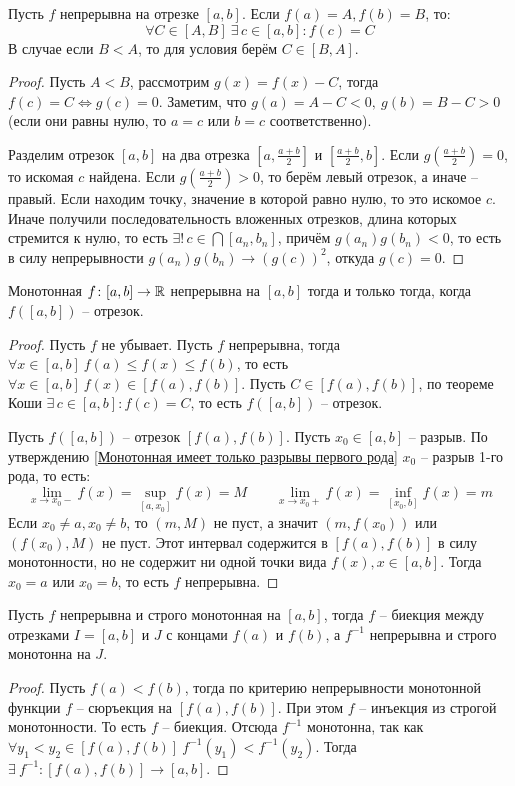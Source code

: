 \documentclass[12pt]{article}
\begin{document}
\begin{theorem}[Коши]
	Пусть $f$ непрерывна на отрезке $[a,b]$. Если $f(a)=A, f(b)=B$, то:
	\[\forall C\in[A,B]\ \exists\,c\in[a,b]\colon f(c)=C\]
	В случае если $B<A$, то для условия берём $C\in[B,A]$.
	\begin{proof}
		Пусть $A<B$, рассмотрим $g(x)=f(x)-C$, тогда $f(c)=C\iff g(c)=0$.
		Заметим, что $g(a)=A-C<0,\ g(b)=B-C>0$ (если они равны нулю, то
		$a=c$ или $b=c$ соответственно).\par

		Разделим отрезок $[a,b]$ на два отрезка
		$\left[a,\frac{a+b}{2}\right]$ и $\left[\frac{a+b}{2}, b\right]$.
		Если $g\left(\frac{a+b}{2}\right)=0$, то искомая $c$ найдена. Если
		$g\left(\frac{a+b}{2}\right)>0$, то берём левый отрезок, а иначе --
		правый. Если находим точку, значение в которой равно нулю, то это
		искомое $c$. Иначе получили последовательность вложенных отрезков,
		длина которых стремится к нулю, то есть
		$\exists!\,c\in\bigcap[a_n,b_n]$, причём
		$g(a_n)g(b_n)<0$, то есть в силу непрерывности
		$g(a_n)g(b_n)\to(g(c))^2$, откуда $g(c)=0$.
	\end{proof}
\end{theorem}
\begin{theorem}
	Монотонная $f\colon[a,b]\to\mathbb{R}$ непрерывна на $[a,b]$ тогда и
	только тогда, когда $f([a,b])$ -- отрезок.
	\begin{proof}
		Пусть $f$ не убывает. Пусть $f$ непрерывна, тогда $\forall
		x\in[a,b]\ f(a)\leqslant f(x)\leqslant f(b)$, то есть $\forall
		x\in[a,b]\ f(x)\in[f(a), f(b)]$. Пусть $C\in[f(a), f(b)]$, по
		теореме Коши $\exists\,c\in[a,b]\colon f(c)=C$, то есть $f([a,b])$
		-- отрезок.\par

		Пусть $f([a,b])$ -- отрезок $[f(a), f(b)]$.  Пусть $x_0\in[a,b]$ --
		разрыв. По утверждению \ref{Монотонная имеет только разрывы первого
		рода} $x_0$ -- разрыв 1-го рода, то есть:
		\[\lim_{x\to x_0-}f(x)=\sup_{[a,x_0]}f(x)=M\qquad\lim_{x\to
		x_0+}f(x)=\inf_{[x_0, b]}f(x)=m\]
		Если $x_0\neq a, x_0\neq b$, то $(m, M)$ не пуст, а значит $(m,
		f(x_0))$ или $(f(x_0), M)$ не пуст. Этот интервал содержится в
		$[f(a), f(b)]$ в силу монотонности, но не содержит ни одной точки
		вида $f(x), x\in[a,b]$. Тогда $x_0=a$ или $x_0=b$, то есть $f$ непрерывна.
	\end{proof}
\end{theorem}
\begin{theorem}
	Пусть $f$ непрерывна и строго монотонная на $[a,b]$, тогда $f$ --
	биекция между отрезками $I=[a,b]$ и $J$ с концами $f(a)$ и $f(b)$, а
	$f^{-1}$ непрерывна и строго монотонна на $J$.
	\begin{proof}
		Пусть $f(a)<f(b)$, тогда по критерию непрерывности монотонной
		функции $f$ -- сюръекция на $[f(a), f(b)]$. При этом $f$ --
		инъекция из строгой монотонности. То есть $f$ -- биекция. Отсюда
		$f^{-1}$ монотонна, так как $\forall y_1<y_2\in[f(a),
		f(b)]\ f^{-1}(y_1)<f^{-1}(y_2)$. Тогда $\exists\ f^{-1}\colon[f(a),
		f(b)]\to[a,b]$.
	\end{proof}
\end{theorem}
\end{document}

